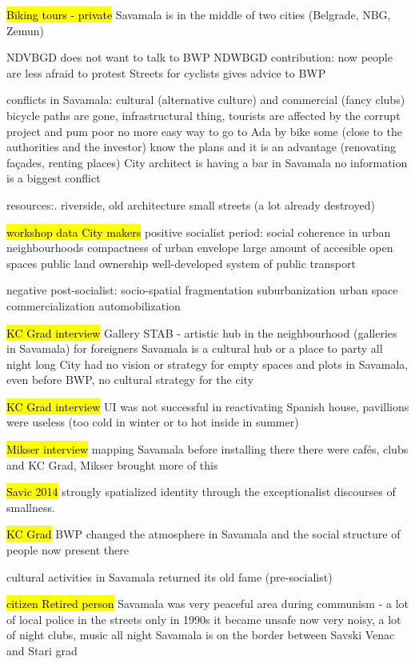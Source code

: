 \documentclass[11pt]{report}
\begin{document}
\hl{Biking tours - private}
Savamala is in the middle of two cities (Belgrade, NBG, Zemun)

NDVBGD does not want to talk to BWP
NDWBGD contribution: now people are less afraid to protest
Streets for cyclists gives advice to BWP

conflicts in Savamala:
cultural (alternative culture) and commercial (fancy clubs)
bicycle paths are gone, infrastructural thing,
tourists are affected by the corrupt project and pum poor
no more easy way to go to Ada by bike
some (close to the authorities and the investor) know the plans and it is an advantage (renovating façades, renting places)
City architect is having a bar in Savamala
no information is a biggest conflict

resources:.
riverside,
old architecture
small streets (a lot already destroyed)

\hl{workshop data City makers}
positive socialist period:
social coherence in urban neighbourhoods
compactness of urban envelope
large amount of accesible open spaces
public land ownership
well-developed system of public transport

negative post-socialist:
socio-spatial fragmentation
suburbanization
urban space
commercialization
automobilization

\hl{KC Grad interview}
Gallery STAB - artistic hub in the neighbourhood (galleries in Savamala)
for foreigners Savamala is a cultural hub
or a place to party all night long
City had no vision or strategy for empty spaces and plots in Savamala, even before BWP, no cultural strategy for the city

\hl{KC Grad interview}
UI was not successful in reactivating Spanish house, pavillions were useless (too cold in winter or to hot inside in summer)

\hl{Mikser interview}
mapping Savamala before installing there
there were cafés, clubs and KC Grad, Mikser brought more of this

\hl{Savic 2014}
strongly spatialized identity through the exceptionalist discourses of smallness.

\hl{KC Grad}
BWP changed the atmosphere in Savamala and the social structure of people now present there

cultural activities in Savamala returned its old fame (pre-socialist)

\hl{citizen Retired person}
Savamala was very peaceful area during communism - a lot of local police in the streets
only in 1990s it became unsafe
now very noisy, a lot of night clubs, music all night
Savamala is on the border between Savski Venac and Stari grad
\end{document}
